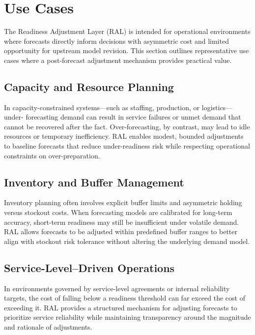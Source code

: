 \section{Use Cases}

The Readiness Adjustment Layer (RAL) is intended for operational environments
where forecasts directly inform decisions with asymmetric cost and limited
opportunity for upstream model revision. This section outlines representative
use cases where a post-forecast adjustment mechanism provides practical value.

\subsection{Capacity and Resource Planning}

In capacity-constrained systems—such as staffing, production, or logistics—under-
forecasting demand can result in service failures or unmet demand that cannot be
recovered after the fact. Over-forecasting, by contrast, may lead to idle
resources or temporary inefficiency. RAL enables modest, bounded adjustments to
baseline forecasts that reduce under-readiness risk while respecting operational
constraints on over-preparation.

\subsection{Inventory and Buffer Management}

Inventory planning often involves explicit buffer limits and asymmetric holding
versus stockout costs. When forecasting models are calibrated for long-term
accuracy, short-term readiness may still be insufficient under volatile demand.
RAL allows forecasts to be adjusted within predefined buffer ranges to better
align with stockout risk tolerance without altering the underlying demand model.

\subsection{Service-Level–Driven Operations}

In environments governed by service-level agreements or internal reliability
targets, the cost of falling below a readiness threshold can far exceed the cost
of exceeding it. RAL provides a structured mechanism for adjusting forecasts to
prioritize service reliability while maintaining transparency around the
magnitude and rationale of adjustments.

